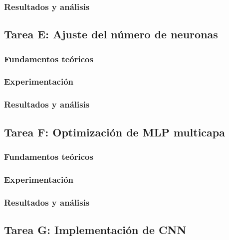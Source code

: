 \documentclass[11pt,a4paper]{article}
\begin{document}
\subsubsection{Resultados y análisis}

\subsection{Tarea E: Ajuste del número de neuronas}
\subsubsection{Fundamentos teóricos}

\subsubsection{Experimentación}

\subsubsection{Resultados y análisis}

\subsection{Tarea F: Optimización de MLP multicapa}
\subsubsection{Fundamentos teóricos}

\subsubsection{Experimentación}

\subsubsection{Resultados y análisis}

\subsection{Tarea G: Implementación de CNN}
\end{document}
